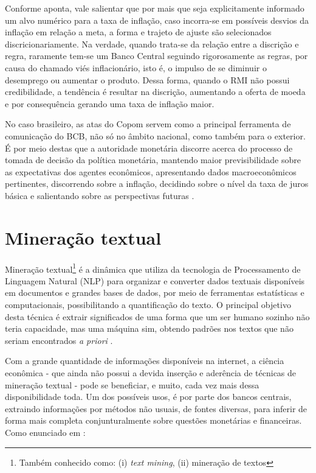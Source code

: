 Conforme  aponta, vale salientar que por mais que seja explicitamente informado um alvo numérico para a taxa de inflação, caso incorra-se em possíveis desvios da inflação em relação a meta, a forma e trajeto de ajuste são selecionados discricionariamente. Na verdade, quando trata-se da relação entre a discrição e regra, raramente tem-se um Banco Central seguindo rigorosamente as regras, por causa do chamado viés inflacionário, isto é, o impulso de se diminuir o desemprego ou aumentar o produto. Dessa forma, quando o RMI não possui credibilidade, a tendência é resultar na discrição, aumentando a oferta de moeda e por consequência gerando uma taxa de inflação maior. 

No caso brasileiro, as atas do Copom servem como a principal ferramenta de comunicação do BCB, não só no âmbito nacional, como também para o exterior. É por meio destas que a autoridade monetária discorre acerca do processo de tomada de decisão da política monetária, mantendo maior previsibilidade sobre as expectativas dos agentes econômicos, apresentando dados macroeconômicos pertinentes, discorrendo sobre a inflação, decidindo sobre o nível da taxa de juros básica e salientando sobre as perspectivas futuras \cite{costa2010mercado}.

\section{Mineração textual} \label{section:mineracao_textual}

Mineração textual\footnote[3]{Também conhecido como: (i) \textit{text mining}, (ii) mineração de textos} é a dinâmica que utiliza da tecnologia de Processamento de Linguagem Natural (NLP) para organizar e converter dados textuais disponíveis em documentos e grandes bases de dados, por meio de ferramentas estatísticas e computacionais, possibilitando a quantificação do texto. O principal objetivo desta técnica é extrair significados de uma forma que um ser humano sozinho não teria capacidade, mas uma máquina sim, obtendo padrões nos textos que não seriam encontrados \textit{a priori} \cite{bholat_etal2015}.

Com a grande quantidade de informações disponíveis na internet, a ciência econômica - que ainda não possui a devida inserção e aderência de técnicas de mineração textual - pode se beneficiar, e muito, cada vez mais dessa disponibilidade toda. Um dos possíveis usos, é por parte dos bancos centrais, extraindo informações por métodos não usuais, de fontes diversas, para inferir de forma mais completa conjunturalmente sobre questões monetárias e financeiras. Como enunciado em : 

